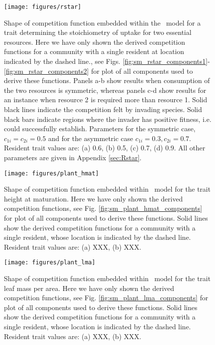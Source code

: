 \documentclass[a4paper,11pt]{article}
\begin{document}
\begin{figure}[h]
  \centering
  \texttt{[image: figures/rstar]}
  \caption{Shape of competition function embedded within the \Rstar\ model
  for a trait determining the stoichiometry of uptake for two essential resources.
  Here we have only shown the derived  competition functions for a
  community with a single resident at location indicated by the dashed line., see Figs.
  \ref{fig:sm_rstar_components1}-\ref{fig:sm_rstar_components2} for plot of all
  components used to derive these functions.
  Panels a-b show results when consumption of the two resources is symmetric, whereas
  panels c-d show results for an instance when resource 2 is required more than
  resource 1.
  Solid black lines indicate the competition felt by invading species. Solid
  black bars indicate regions where the invader has positive fitness, i.e.
  could successfully establish. Parameters for the symmetric case, $c_{1i} =
  c_ {2i}=0.5$ and for the asymmetric case $c_{1i} = 0.3, c_ {2i}=0.7$. Resident
  trait values are: (a) 0.6, (b) 0.5, (c) 0.7, (d) 0.9. All other parameters
  are given in Appendix \ref{sec:Rstar}.}
  \label{fig:Rstar}
\end{figure}

\begin{figure}[h]
  \centering
  \texttt{[image: figures/plant\_hmat]}
  \caption{Shape of competition function embedded within \plant\ model for
  the trait height at maturation.
  Here we have only shown the derived  competition functions, see Fig.
  \ref{fig:sm_plant_hmat_components} for plot of all components used to derive these functions.
  Solid lines show the derived competition functions for a community with a
  single resident, whose location is indicated by the dashed line.
  Resident trait values are: (a) XXX, (b) XXX.}
  \label{fig:plant_hmat}
\end{figure}

\begin{figure}[h]
  \centering
  \texttt{[image: figures/plant\_lma]}
  \caption{Shape of competition function embedded within \plant\ model for
  the trait leaf mass per area.
  Here we have only shown the derived  competition functions, see Fig.
  \ref{fig:sm_plant_lma_components} for plot of all components used to derive these functions.
  Solid lines show the derived competition functions for a community with a
  single resident, whose location is indicated by the dashed line.
  Resident trait values are: (a) XXX, (b) XXX.}
  \label{fig:plant_lma}
\end{figure}
\end{document}
